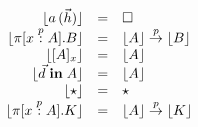 \begin{figure}

\begin{center}
\begin{math}
\begin{array}{rclr}
\lfloor a\,(\vec{h}) \rfloor
&=&
\square
\\

\lfloor \pi [x \stackrel{p}{:} A]. B \rfloor
&=&
\lfloor A \rfloor \stackrel{p}{\rightarrow} \lfloor B \rfloor
\\

\lfloor [ A ]_{x} \rfloor
&=&
\lfloor A \rfloor
\\

\lfloor \vec{d} \;\textbf{in}\; A \rfloor
&=&
\lfloor A \rfloor
\\

\lfloor \star \rfloor
&=&
\star
\\

\lfloor \pi [x \stackrel{p}{:} A]. K \rfloor
&=&
\lfloor A \rfloor \stackrel{p}{\rightarrow} \lfloor K \rfloor
\\

\end{array}
\end{math}
\end{center}
\end{figure}
